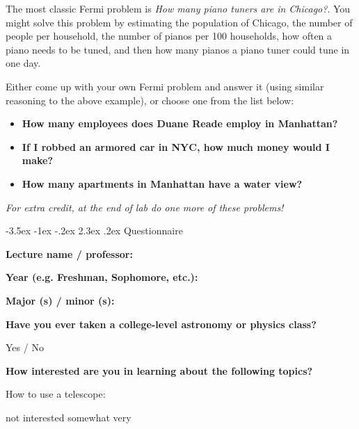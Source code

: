 \documentclass[12pt]{article}
\makeatletter
\renewcommand\section{\@startsection{section}{1}{\z@}%
                                  {-3.5ex \@plus -1ex \@minus -.2ex}%
                                  {2.3ex \@plus.2ex}%
                                  {\normalfont\large\bfseries}}
\makeatother
\begin{document}
The most classic Fermi problem is \emph{How many piano tuners are in Chicago?}. You might solve this problem by estimating the population of Chicago, the number of people per household, the number of pianos per 100 households, how often a piano needs to be tuned, and then how many pianos a piano tuner could tune in one day. 

Either come up with your own Fermi problem and answer it (using similar reasoning to the above example), or choose one from the list below:

\begin{itemize}
	\item \textbf{How many employees does Duane Reade employ in Manhattan?}
	\item \textbf{If I robbed an armored car in NYC, how much money would I make?}
	\item \textbf{How many apartments in Manhattan have a water view?}
\end{itemize}

\emph{For extra credit, at the end of lab do one more of these problems!}

\clearpage

\section{Questionnaire}

\noindent\textbf{Lecture name / professor:}

\vspace{0.2in}

\noindent\textbf{Year (e.g. Freshman, Sophomore, etc.):}

\vspace{0.2in}

\noindent\textbf{Major (s) / minor (s):}

\vspace{0.2in}

\noindent\textbf{Have you ever taken a college-level astronomy or physics class?}

\vspace{0.1in}
Yes / No

\vspace{0.2in}
\noindent\textbf{How interested are you in learning about the following topics?}

\vspace{0.1in}

How to use a telescope:
\begin{center}
	not interested \hspace{0.3in} somewhat \hspace{0.3in} very
\end{center}
\end{document}
